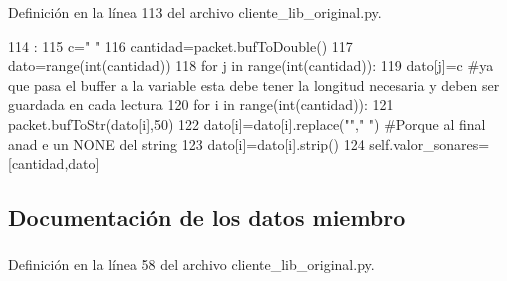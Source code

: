 Definición en la línea 113 del archivo cliente\_\-lib\_\-original.py.


\begin{DoxyCode}
114                                         :
115                 c="                                                              
                                                          "
116                 cantidad=packet.bufToDouble()
117                 dato=range(int(cantidad))
118                 for j in range(int(cantidad)):
119                         dato[j]=c #ya que pasa el buffer a la variable esta debe 
      tener la longitud necesaria y deben ser guardada en cada lectura
120                 for i in range(int(cantidad)):
121                         packet.bufToStr(dato[i],50)
122                         dato[i]=dato[i].replace(""," ") #Porque al final anad
      e un NONE del string
123                         dato[i]=dato[i].strip() 
124                 self.valor_sonares=[cantidad,dato]

\end{DoxyCode}


\subsection{Documentación de los datos miembro}
\hypertarget{classcliente__lib__original_1_1cliente__lib_a049a973bc28127e24c2c717de93daf2f}{
\subsubsection[{acu}]{}}
\label{classcliente__lib__original_1_1cliente__lib_a049a973bc28127e24c2c717de93daf2f}


Definición en la línea 58 del archivo cliente\_\-lib\_\-original.py.

\hypertarget{classcliente__lib__original_1_1cliente__lib_a030e232b37138f0a2ba15a3ef5f1fe21}{
\subsubsection[{ip}]{}}
\label{classcliente__lib__original_1_1cliente__lib_a030e232b37138f0a2ba15a3ef5f1fe21}


